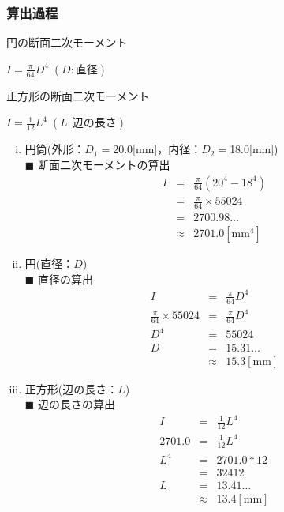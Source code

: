 \documentclass[twocolumn,a4j]{jsarticle}
\begin{document}
\subsubsection{算出過程}
    \begin{itembox}[l]{円の断面二次モーメント}
        \begin{center}
            $\displaystyle I = \frac{\pi}{64}D^4\;\left(D:直径\right)$
        \end{center}
    \end{itembox}
    \begin{itembox}[l]{正方形の断面二次モーメント}
        \begin{center}
            $\displaystyle I = \frac{1}{12}L^4\;\left(L:辺の長さ\right)$
        \end{center}
    \end{itembox}

    \newpage
    
    \begin{enumerate}[(i)]
        \item 円筒(外形：$D_1=$20.0[mm]，内径：$D_2=$18.0[mm])\\
        $\blacksquare$ 断面二次モーメントの算出
        \begin{eqnarray*}
            I &=& \frac{\pi}{64} \left(20^4 - 18^4\right)\\
            &=& \frac{\pi}{64} × 55024\\
            &=& 2700.98 \dots\\
            &\approx& 2701.0 \left[\mathrm{mm^4}\right]
        \end{eqnarray*}
        \item 円(直径：$D$)\\
        $\blacksquare$ 直径の算出 
        \begin{eqnarray*}
            I &=& \frac{\pi}{64}D^4\\
            \frac{\pi}{64} × 55024 &=& \frac{\pi}{64}D^4\\
            D^4 &=& 55024\\
            D&=& 15.31\dots\\
            &\approx& 15.3 \left[\mathrm{mm}\right]
        \end{eqnarray*}
        \item 正方形(辺の長さ：$L$)\\
        $\blacksquare$ 辺の長さの算出
        \begin{eqnarray*}
            I &=& \frac{1}{12}L^4\\
            2701.0 &=& \frac{1}{12}L^4\\
            L^4 &=& 2701.0 * 12\\
            &=& 32412\\
            L&=& 13.41\dots\\
            &\approx& 13.4 \left[\mathrm{mm}\right]
        \end{eqnarray*}
    \end{enumerate}
\end{document}
